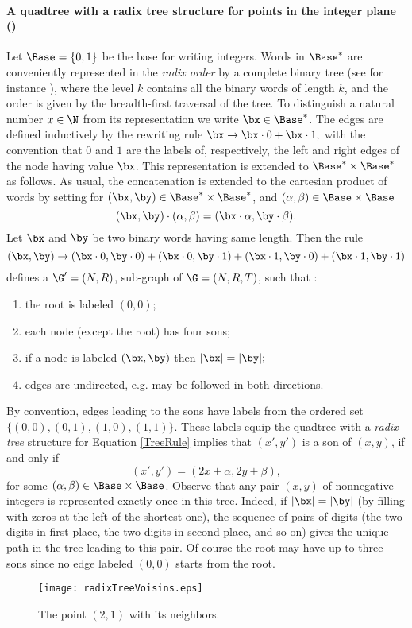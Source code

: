 \paragraph*{A quadtree with a radix tree structure for points in the integer plane {\rm(\cite{BKPproc,BKP})}}
Let $\Base=\{0,1\}$ be the base  for writing  integers. Words in $\Base^*$ are conveniently represented in the {\em radix order} by a complete binary tree (see for instance \cite{knuth3,lothaire3}), where the level $k$ contains all the binary words of length $k$, and the order is given by the breadth-first traversal of  the tree. To distinguish a natural number $x\in \N$ from its representation we write $\bx\in \Base^*$.  The edges are defined inductively by the rewriting rule $\bx \to \bx\cdot 0 + \bx\cdot 1,$ with the convention that  $0$ and $1$ are the labels of, respectively,  the left and right edges of the node having value $\bx$. This representation  is extended to $\Base^*\times \Base^*$ as follows. As usual, the concatenation is extended to the cartesian product of words by setting for $(\bx,\by) \in \Base^*\times \Base^*$, and $(\alpha,\beta) \in \Base\times \Base$
$$(\bx,\by)\cdot(\alpha,\beta)= (\bx\cdot\alpha,\by\cdot\beta).$$
Let $\bx$ and $\by$ be two binary words having same length.  Then the rule 
\begin{equation}(\bx,\by) \to (\bx\cdot 0, \by\cdot 0) + (\bx\cdot 0, \by\cdot 1)  + (\bx\cdot 1, \by\cdot 0)  +(\bx\cdot 1, \by\cdot 1) \label{TreeRule}
\end{equation}
defines a   $\G' =(N,R)$, sub-graph  of  $\G = (N,R,T)$,   such that :
\begin{enumerate}[\rm (i)]
 \item the root is labeled $(0, 0)$;
 \item each  node (except the root) has four sons;
 \item if a node is labeled $(\bx,\by)$ then $|\bx|=|\by|;$ 
 \item edges are undirected, e.g. may be followed in both directions.
 \end{enumerate}
 By convention, edges leading to the sons have labels from the ordered set $\{(0,0), (0,1), (1,0), (1,1)\}$. These labels equip  the quadtree  with a \emph{radix tree} structure for Equation \eqref{TreeRule} implies that $(x', y')$ is a son of $(x,y)$, if and only if
\[(x', y') = (2x+ \alpha, 2y+\beta),\] 
for some   $(\alpha, \beta) \in  \Base\times \Base$. Observe that any pair $(x, y)$ of nonnegative integers is represented exactly once in this tree. Indeed, if  $|\bx| =|\by|$  (by filling with zeros at the left of the shortest one), the sequence of pairs of digits (the two digits in first place, the two digits in second place, and so on) gives the unique path in the tree leading to this pair. Of course the root may have up to three sons since no edge labeled $(0,0)$  starts from the root.\\ 
\begin{figure}[h!]
\centering
\texttt{[image: radixTreeVoisins.eps]}
\caption{The  point $(2,1)$ with its neighbors.}\label{RadixTree}
\end{figure}
